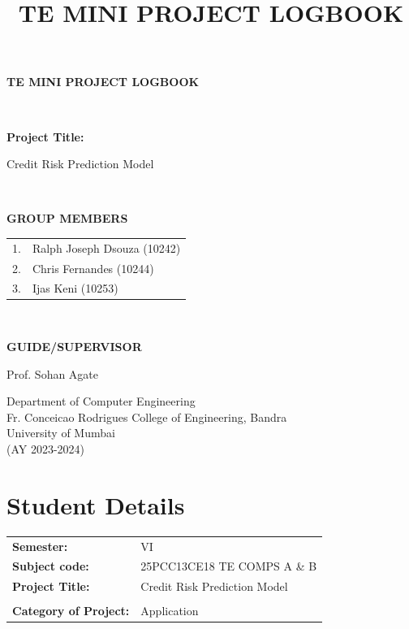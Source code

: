 \documentclass[12pt,a4paper]{article}
\title{\textbf{TE MINI PROJECT LOGBOOK}}
\author{}
\date{}
\begin{document}
\begin{titlepage}
\centering
\vspace*{2cm}
{\Huge\bfseries TE MINI PROJECT LOGBOOK\par}
\vspace{2cm}
\\[2cm]
{\Large\bfseries Project Title:\par}
{\Large Credit Risk Prediction Model\par}
\vspace{2cm}
\\[1cm]
{\Large\bfseries GROUP MEMBERS\par}
\vspace{0.5cm}
\begin{tabular}{l l}
1. & Ralph Joseph Dsouza (10242) \\
2. & Chris Fernandes (10244) \\
3. & Ijas Keni (10253) \\
\end{tabular}
\\[2cm]
{\Large\bfseries GUIDE/SUPERVISOR\par}
\vspace{0.5cm}
Prof. Sohan Agate \underline{\hspace{5cm}}
\\[2cm]
\begin{center}
Department of Computer Engineering \\
Fr. Conceicao Rodrigues College of Engineering, Bandra \\
University of Mumbai \\
(AY 2023-2024)
\end{center}
\end{titlepage}

\newpage

\section*{Student Details}
\vspace{0.5cm}

\begin{tabular}{p{3cm} p{10cm}}
\textbf{Semester:} & VI \\
\textbf{Subject code:} & 25PCC13CE18 TE COMPS A \& B \\
\textbf{Project Title:} & Credit Risk Prediction Model \\
 & \\
\textbf{Category of Project:} & Application \\
\end{tabular}
\end{document}
